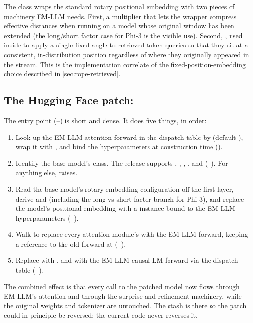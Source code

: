 The class  wraps the standard rotary positional embedding with two pieces of machinery EM-LLM needs. First, a  multiplier that lets the wrapper compress effective distances when running on a model whose original window has been extended (the long/short factor case for Phi-3 is the visible use). Second, , used inside  to apply a single fixed angle to retrieved-token queries so that they sit at a consistent, in-distribution position regardless of where they originally appeared in the stream. This is the implementation correlate of the fixed-position-embedding choice described in \cref{sec:rope-retrieved}.

\subsection{The Hugging Face patch: }
\label{sec:walkthrough-patch-hf}

The entry point  (--) is short and dense. It does five things, in order:
\begin{enumerate}
  \item Look up the EM-LLM attention forward in the  dispatch table by  (default ), wrap it with , and bind the hyperparameters at construction time ().
  \item Identify the base model's class. The release supports , , , , and  (--). For anything else,  raises.
  \item Read the base model's rotary embedding configuration off the first layer, derive  and  (including the long-vs-short factor branch for Phi-3), and replace the model's positional embedding with a  instance bound to the EM-LLM hyperparameters (--).
  \item Walk  to replace every attention module's  with the EM-LLM forward, keeping a reference to the old forward at  (--).
  \item Replace  with , and  with the EM-LLM causal-LM forward via the  dispatch table (--).
\end{enumerate}
The combined effect is that every call to the patched model now flows through EM-LLM's attention and through the surprise-and-refinement machinery, while the original weights and tokenizer are untouched. The  stash is there so the patch could in principle be reversed; the current code never reverses it.


